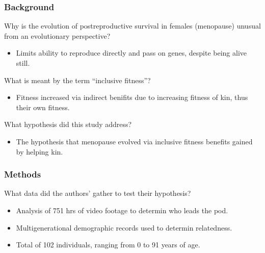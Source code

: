 \documentclass[12pt,a4paper]{article}
\begin{document}
\subsubsection{Background}
\begin{itemize}
    {\color{G-Moon}\item Why is the evolution of postreproductive survival in females (menopause) unusual from an evolutionary perspective?}
        \begin{itemize}
            \item Limits ability to reproduce directly and pass on genes, despite being alive still.
        \end{itemize}
    {\color{G-Moon}\item What is meant by the term “inclusive fitness”?}
        \begin{itemize}
            \item Fitness increased via indirect benifits due to increasing fitness of kin, thus their own fitness.
        \end{itemize}
    {\color{G-Moon}\item What hypothesis did this study address?}
        \begin{itemize}
            \item The hypothesis that menopause evolved via inclusive fitness benefits gained by helping kin.
        \end{itemize}
\end{itemize}
\subsubsection{Methods}
\begin{itemize}
    {\color{G-Moon}\item What data did the authors’ gather to test their hypothesis?}
        \begin{itemize}
            \item Analysis of 751 hrs of video footage to determin who leads the pod.
            \item Multigenerational demographic records used to determin relatedness.
            \item Total of 102 individuals, ranging from 0 to 91 years of age.
        \end{itemize}
\end{itemize}
\end{document}
